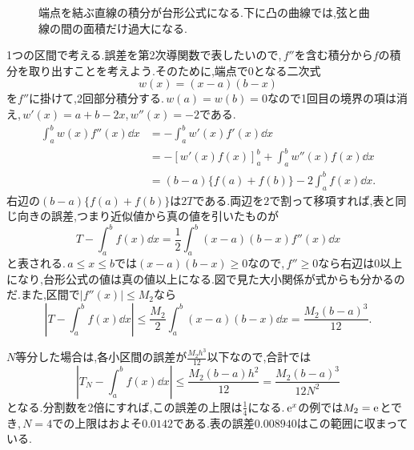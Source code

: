 \begin{figure}[htbp]
\centering
{}
\caption{端点を結ぶ直線の積分が台形公式になる.下に凸の曲線では,弦と曲線の間の面積だけ過大になる.}
\label{図:台形近似}
\end{figure}

1つの区間で考える.誤差を第2次導関数で表したいので,\,$f''$を含む積分から$f$の積分を取り出すことを考えよう.そのために,端点で$0$となる二次式
\[
 w(x)=(x-a)(b-x)
\]
を$f''$に掛けて,2回部分積分する.\,$w(a)=w(b)=0$なので1回目の境界の項は消え,\,$w'(x)=a+b-2x$,\,$w''(x)=-2$である.
\begin{align*}
 \int_a^b w(x)f''(x)\dd x
 &=-\int_a^bw'(x)f'(x)\dd x\\
 &=-[w'(x)f(x)]_a^b+\int_a^bw''(x)f(x)\dd x\\
 &=(b-a)\{f(a)+f(b)\}-2\int_a^bf(x)\dd x.
\end{align*}
右辺の$(b-a)\{f(a)+f(b)\}$は$2T$である.両辺を$2$で割って移項すれば,表と同じ向きの誤差,つまり近似値から真の値を引いたものが
\[
 \boxed{T-\int_a^bf(x)\dd x
 =\frac12\int_a^b(x-a)(b-x)f''(x)\dd x}
\]
と表される.\,$a\le x\le b$では$(x-a)(b-x)\ge0$なので,\,$f''\ge0$なら右辺は$0$以上になり,台形公式の値は真の値以上になる.図で見た大小関係が式からも分かるのだ.また,区間で$|f''(x)|\le M_2$なら
\[
 \left|T-\int_a^bf(x)\dd x\right|
 \le\frac{M_2}{2}\int_a^b(x-a)(b-x)\dd x
 =\frac{M_2(b-a)^3}{12}.
\]

$N$等分した場合は,各小区間の誤差が$\frac{M_2h^3}{12}$以下なので,合計では
\[
 \left|T_N-\int_a^bf(x)\dd x\right|
 \le\frac{M_2(b-a)h^2}{12}
 =\frac{M_2(b-a)^3}{12N^2}
\]
となる.分割数を2倍にすれば,この誤差の上限は$\frac14$になる.\,$\mathrm{e}^x$の例では$M_2=\mathrm{e}$とでき,\,$N=4$での上限はおよそ$0.0142$である.表の誤差$0.008940$はこの範囲に収まっている.

